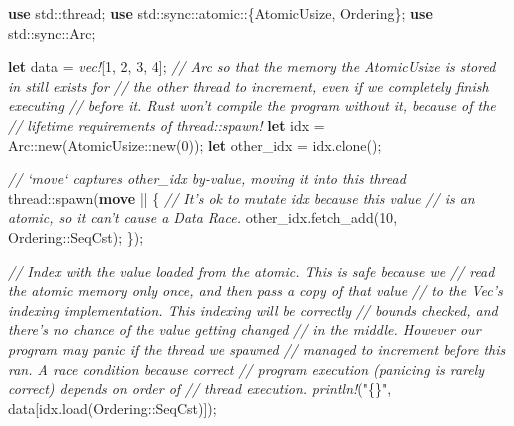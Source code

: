 \documentclass[a4paper,]{book}
\newenvironment{Shaded}{\begin{snugshade}}{\end{snugshade}}
\newcommand{\KeywordTok}[1]{\textcolor[rgb]{0.13,0.29,0.53}{\textbf{{#1}}}}
\newcommand{\DecValTok}[1]{\textcolor[rgb]{0.00,0.00,0.81}{{#1}}}
\newcommand{\StringTok}[1]{\textcolor[rgb]{0.31,0.60,0.02}{{#1}}}
\newcommand{\CommentTok}[1]{\textcolor[rgb]{0.56,0.35,0.01}{\textit{{#1}}}}
\newcommand{\PreprocessorTok}[1]{\textcolor[rgb]{0.56,0.35,0.01}{\textit{{#1}}}}
\newcommand{\NormalTok}[1]{{#1}}
\begin{document}
\begin{Shaded}
\begin{Highlighting}[]
\KeywordTok{use} \NormalTok{std::thread;}
\KeywordTok{use} \NormalTok{std::sync::atomic::\{AtomicUsize, Ordering\};}
\KeywordTok{use} \NormalTok{std::sync::Arc;}

\KeywordTok{let} \NormalTok{data = }\PreprocessorTok{vec!}\NormalTok{[}\DecValTok{1}\NormalTok{, }\DecValTok{2}\NormalTok{, }\DecValTok{3}\NormalTok{, }\DecValTok{4}\NormalTok{];}
\CommentTok{// Arc so that the memory the AtomicUsize is stored in still exists for}
\CommentTok{// the other thread to increment, even if we completely finish executing}
\CommentTok{// before it. Rust won't compile the program without it, because of the}
\CommentTok{// lifetime requirements of thread::spawn!}
\KeywordTok{let} \NormalTok{idx = Arc::new(AtomicUsize::new(}\DecValTok{0}\NormalTok{));}
\KeywordTok{let} \NormalTok{other_idx = idx.clone();}

\CommentTok{// `move` captures other_idx by-value, moving it into this thread}
\NormalTok{thread::spawn(}\KeywordTok{move} \NormalTok{|| \{}
    \CommentTok{// It's ok to mutate idx because this value}
    \CommentTok{// is an atomic, so it can't cause a Data Race.}
    \NormalTok{other_idx.fetch_add(}\DecValTok{10}\NormalTok{, Ordering::SeqCst);}
\NormalTok{\});}

\CommentTok{// Index with the value loaded from the atomic. This is safe because we}
\CommentTok{// read the atomic memory only once, and then pass a copy of that value}
\CommentTok{// to the Vec's indexing implementation. This indexing will be correctly}
\CommentTok{// bounds checked, and there's no chance of the value getting changed}
\CommentTok{// in the middle. However our program may panic if the thread we spawned}
\CommentTok{// managed to increment before this ran. A race condition because correct}
\CommentTok{// program execution (panicing is rarely correct) depends on order of}
\CommentTok{// thread execution.}
\PreprocessorTok{println!}\NormalTok{(}\StringTok{"\{\}"}\NormalTok{, data[idx.load(Ordering::SeqCst)]);}
\end{Highlighting}
\end{Shaded}
\end{document}
